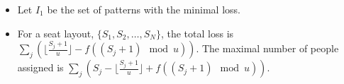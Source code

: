     \begin{frame}
      \begin{itemize}
        \item Let $I_1$ be the set of patterns with the minimal loss.
        \item For a seat layout, $\{S_1, S_2, \ldots, S_{N}\}$, the total loss is $\sum_{j} (\lfloor \frac{S_j+1}{u} \rfloor - f((S_j +1)\mod u))$. The maximal number of people assigned is $\sum_{j} (S_j - \lfloor \frac{S_j+1}{u} \rfloor + f((S_j +1)\mod u))$.
      \end{itemize}
    \end{frame}



